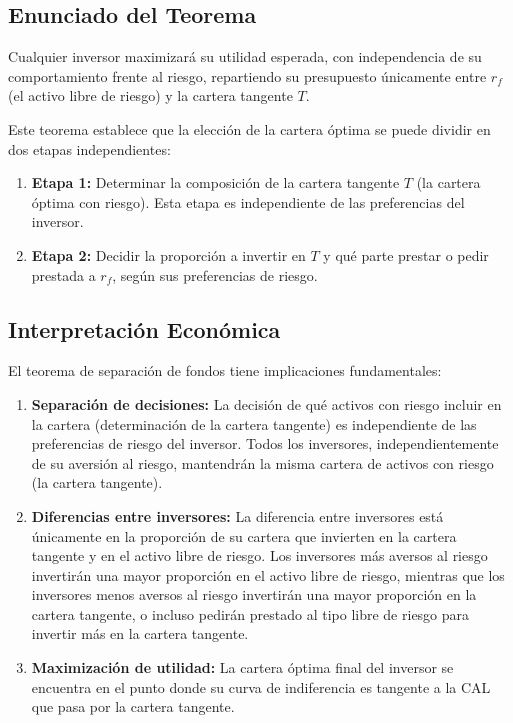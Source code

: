 \subsection{Enunciado del Teorema}

\begin{teorema}
Cualquier inversor maximizará su utilidad esperada, con independencia de su comportamiento frente al riesgo, repartiendo su presupuesto únicamente entre $r_f$ (el activo libre de riesgo) y la cartera tangente $T$.
\end{teorema}

Este teorema establece que la elección de la cartera óptima se puede dividir en dos etapas independientes:

\begin{enumerate}
\item \textbf{Etapa 1:} Determinar la composición de la cartera tangente $T$ (la cartera óptima con riesgo). Esta etapa es independiente de las preferencias del inversor.
\item \textbf{Etapa 2:} Decidir la proporción a invertir en $T$ y qué parte prestar o pedir prestada a $r_f$, según sus preferencias de riesgo.
\end{enumerate}

\subsection{Interpretación Económica}

El teorema de separación de fondos tiene implicaciones fundamentales:

\begin{enumerate}
\item \textbf{Separación de decisiones:} La decisión de qué activos con riesgo incluir en la cartera (determinación de la cartera tangente) es independiente de las preferencias de riesgo del inversor. Todos los inversores, independientemente de su aversión al riesgo, mantendrán la misma cartera de activos con riesgo (la cartera tangente).

\item \textbf{Diferencias entre inversores:} La diferencia entre inversores está únicamente en la proporción de su cartera que invierten en la cartera tangente y en el activo libre de riesgo. Los inversores más aversos al riesgo invertirán una mayor proporción en el activo libre de riesgo, mientras que los inversores menos aversos al riesgo invertirán una mayor proporción en la cartera tangente, o incluso pedirán prestado al tipo libre de riesgo para invertir más en la cartera tangente.

\item \textbf{Maximización de utilidad:} La cartera óptima final del inversor se encuentra en el punto donde su curva de indiferencia es tangente a la CAL que pasa por la cartera tangente.
\end{enumerate}

